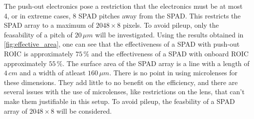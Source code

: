The push-out electronics pose a restriction that the electronics must be at most 4, or in extreme cases, 8 SPAD pitches away from the SPAD. This restricts the SPAD array to a maximum of $2048\times8$  pixels. To avoid pileup, only the feasability of a pitch of $20\,\mu m$ will be investigated. Using the results obtained in \cref{fig:effective_area}, one can see that the effectiveness of a SPAD with push-out ROIC is approximately $75\,\%$ and the effectiveness of a SPAD with onboard ROIC approximately $55\,\%$. The surface area of the SPAD array is a line with a length of $4\,cm$ and a width of atleast $160\,\mu m$. There is no point in using microlenses for these dimensions. They add little to no benefit on the efficiency, and there are several issues with the use of microlenses, like restrictions on the lens, that can't make them justifiable in this setup. To avoid pileup, the feasbility of a SPAD array of $2048\times8$ will be considered.
